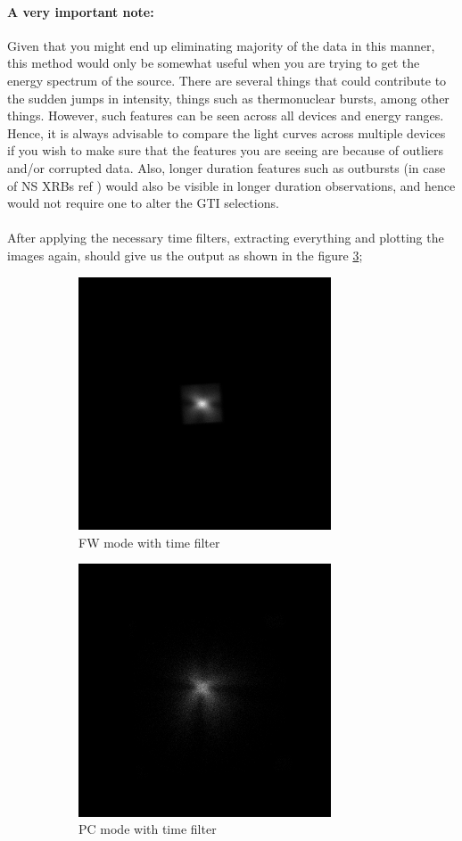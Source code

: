 \documentclass[a4paper,twoside]{report}
\numberwithin{equation}{section}
\begin{document}
\paragraph{A very important note:}
Given that you might end up eliminating majority of the data in this manner, this method would only be somewhat useful when you are trying to get the energy spectrum of the source. There are several things that could contribute to the sudden jumps in intensity, things such as thermonuclear bursts, among other things. However, such features can be seen across all devices and energy ranges. Hence, it is always advisable to compare the light curves across multiple devices if you wish to make sure that the features you are seeing are because of outliers and/or corrupted data. Also, longer duration features such as outbursts (in case of NS XRBs ref \cite{SB}) would also be visible in longer duration observations, and hence would not require one to alter the GTI selections.
\paragraph{}
After applying the necessary time filters, extracting everything and plotting the images again, should give us the output as shown in the figure \ref{Good_FW_and_PC};
\begin{figure}[h]
\begin{subfigure}{0.48\textwidth}
\includegraphics[width=1.0\linewidth, height=7.5cm]{FWF1_t.jpeg} 
\caption{FW mode with time filter}
\label{FW_Good}
\end{subfigure}
\begin{subfigure}{0.48\textwidth}
\includegraphics[width=1.0\linewidth, height=7.5cm]{PC_filt.jpeg}
\caption{PC mode with time filter}
\label{PC_Good}
\end{subfigure}
\caption{}
\label{Good_FW_and_PC}
\end{figure}
\newpage
\end{document}
